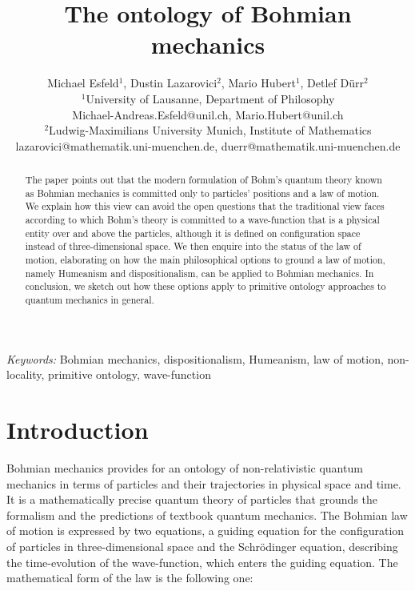 \documentclass[12pt,a4paper]{article}
\title{The ontology of Bohmian mechanics }
\author{Michael Esfeld$^1$, Dustin Lazarovici$^2$,
          Mario Hubert$^1$, Detlef D\"urr$^2$\\[1.5ex]
$^1$University of Lausanne, Department of Philosophy\\
                 \small Michael-Andreas.Esfeld@unil.ch, Mario.Hubert@unil.ch\\
$^2$Ludwig-Maximilians University Munich, Institute of Mathematics\\
\small   lazarovici@mathematik.uni-muenchen.de, duerr@mathematik.uni-muenchen.de}
\date{}
\theoremstyle{definition}
\begin{document}
\maketitle

\begin{abstract}
\noindent The paper points out that the modern formulation of Bohm's quantum theory known as Bohmian mechanics is committed only to particles' positions and a law of motion. We explain how this view can avoid the open questions that the traditional view faces according to which Bohm's theory is committed to a wave-function that is a physical entity over and above the particles, although it is defined on configuration space instead of three-dimensional space. We then enquire into the status of the law of motion, elaborating on how the main philosophical options to ground a law of motion, namely Humeanism and dispositionalism, can be applied to Bohmian mechanics. In conclusion, we sketch out how these options apply to primitive ontology approaches to quantum mechanics in general.
\end{abstract}

\noindent \textit{Keywords:} Bohmian mechanics, dispositionalism, Humeanism, law of motion, non-locality, primitive ontology, wave-function

\tableofcontents{}

\section{Introduction}
Bohmian mechanics provides for an ontology of non-relativistic quantum mechanics in terms of particles and their trajectories in physical space and time. It is a mathematically precise quantum theory of particles that grounds the formalism and the predictions of textbook quantum mechanics. The Bohmian law of motion is expressed by two equations, a guiding equation for the configuration of particles in three-dimensional space and the Schr\"odinger equation, describing the time-evolution of the wave-function, which enters the guiding equation. The mathematical form of the law is the following one:
\end{document}
